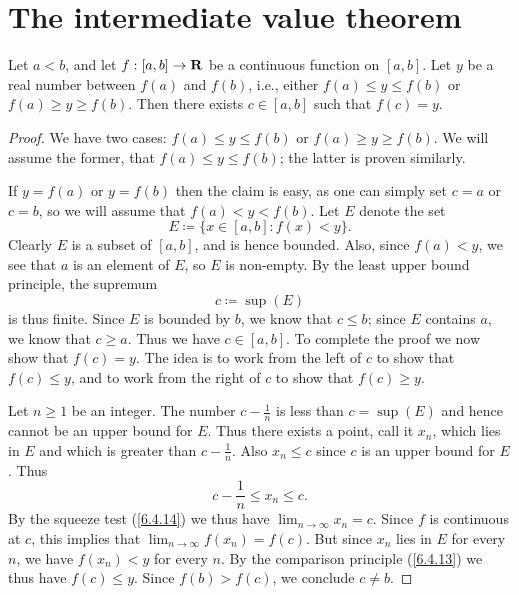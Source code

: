 \section{The intermediate value theorem}\label{sec 9.7}

\begin{theorem}\label{9.7.1}
  Let \(a < b\), and let \(f : [a, b] \to \mathbf{R}\) be a continuous function on \([a, b]\).
  Let \(y\) be a real number between \(f(a)\) and \(f(b)\), i.e., either \(f(a) \leq y \leq f(b)\) or \(f(a) \geq y \geq f(b)\).
  Then there exists \(c \in [a, b]\) such that \(f(c) = y\).
\end{theorem}

\begin{proof}
  We have two cases: \(f(a) \leq y \leq f(b)\) or \(f(a) \geq y \geq f(b)\).
  We will assume the former, that \(f(a) \leq y \leq f(b)\);
  the latter is proven similarly.

  If \(y = f(a)\) or \(y = f(b)\) then the claim is easy, as one can simply set \(c = a\) or \(c = b\), so we will assume that \(f(a) < y < f(b)\).
  Let \(E\) denote the set
  \[
    E \coloneqq \{x \in [a, b] : f(x) < y\}.
  \]
  Clearly \(E\) is a subset of \([a, b]\), and is hence bounded.
  Also, since \(f(a) < y\), we see that \(a\) is an element of \(E\), so \(E\) is non-empty.
  By the least upper bound principle, the supremum
  \[
    c \coloneqq \sup(E)
  \]
  is thus finite.
  Since \(E\) is bounded by \(b\), we know that \(c \leq b\);
  since \(E\) contains \(a\), we know that \(c \geq a\).
  Thus we have \(c \in [a, b]\).
  To complete the proof we now show that \(f(c) = y\).
  The idea is to work from the left of \(c\) to show that \(f(c) \leq y\), and to work from the right of \(c\) to show that \(f(c) \geq y\).

  Let \(n \geq 1\) be an integer.
  The number \(c - \frac{1}{n}\) is less than \(c = \sup(E)\) and hence cannot be an upper bound for \(E\).
  Thus there exists a point, call it \(x_n\), which lies in \(E\) and which is greater than \(c - \frac{1}{n}\).
  Also \(x_n \leq c\) since \(c\) is an upper bound for \(E\).
  Thus
  \[
    c - \frac{1}{n} \leq x_n \leq c.
  \]
  By the squeeze test (\cref{6.4.14}) we thus have \(\lim_{n \to \infty} x_n = c\).
  Since \(f\) is continuous at \(c\), this implies that \(\lim_{n \to \infty} f(x_n) = f(c)\).
  But since \(x_n\) lies in \(E\) for every \(n\), we have \(f(x_n) < y\) for every \(n\).
  By the comparison principle (\cref{6.4.13}) we thus have \(f(c) \leq y\).
  Since \(f(b) > f(c)\), we conclude \(c \neq b\).


\end{proof}
